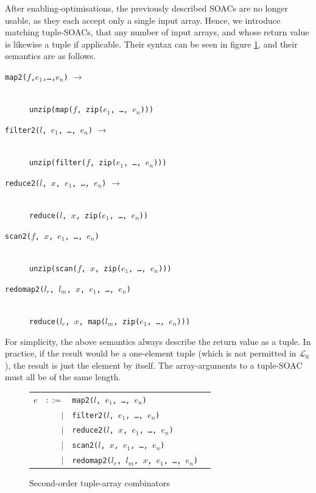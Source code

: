 \documentclass{sigplanconf}  %
\newcommand{\LO}{$\mathcal{L}_0$}
\begin{document}
After enabling-optimisations, the previously described SOACs are no
longer usable, as they each accept only a single input array.  Hence,
we introduce matching tuple-SOACs, that any number of input arrays,
and whose return value is likewise a tuple if applicable.  Their
syntax can be seen in figure \ref{fig:tuple-soacs}, and their
semantics are as follows.

\begin{description}
  \item[{\tt map2($f$,$e_{1}$,\ldots,$e_{n}$)} $\rightarrow$]\hfill\\
    {\tt unzip(map($f$, zip($e_{1}$, \ldots, $e_{n}$)))}


  \item[{\tt filter2($l$, $e_{1}$, \ldots, $e_{n}$)} $\rightarrow$]\hfill\\
    {\tt unzip(filter($f$, zip($e_{1}$, \ldots, $e_{n}$)))}

  \item[{\tt reduce2($l$, $x$, $e_{1}$, \ldots, $e_{n}$)} $\rightarrow$]\hfill\\
    {\tt reduce($l$, $x$, zip($e_{1}$, \ldots, $e_{n}$))}

  \item[{\tt scan2($f$, $x$, $e_{1}$, \ldots, $e_{n}$)}]\hfill\\
    {\tt unzip(scan($f$, $x$, zip($e_{1}$, \ldots, $e_{n}$)))}

  \item[{\tt redomap2($l_{r}$, $l_{m}$, $x$, $e_{1}$, \ldots, $e_{n}$)}]\hfill\\
    {\tt reduce($l_{r}$, $x$, map($l_{m}$, zip($e_{1}$, \ldots, $e_{n}$)))}
\end{description}

For simplicity, the above semantics always describe the return value
as a tuple.  In practice, if the result would be a one-element tuple
(which is not permitted in \LO), the result is just the element by
itself.  The array-arguments to a tuple-SOAC must all be of the same
length.

\begin{figure}[bt]
\begin{tabular}{lrll}
$e$ & $::=$ & {\tt map2($l$, $e_{1}$, \ldots, $e_{n}$)} \\
    & $|$ & {\tt filter2($l$, $e_{1}$, \ldots, $e_{n}$)} \\
    & $|$ & {\tt reduce2($l$, $x$, $e_{1}$, \ldots, $e_{n}$)} \\
    & $|$ & {\tt scan2($l$, $x$, $e_{1}$, \ldots, $e_{n}$)} \\
    & $|$ & {\tt redomap2($l_{r}$, $l_{m}$, $x$, $e_{1}$, \ldots, $e_{n}$)} \\
\end{tabular}
\caption{Second-order tuple-array combinators}
\label{fig:tuple-soacs}
\end{figure}
\end{document}
